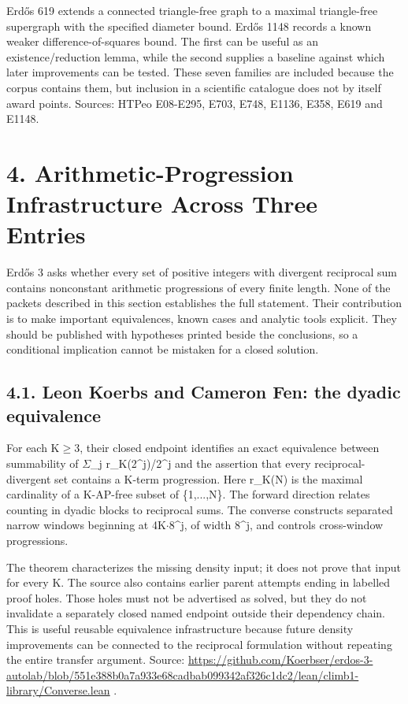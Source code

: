 \documentclass[11pt,a4paper]{article}
\begin{document}
Erdős 619 extends a connected triangle-free graph to a maximal triangle-free supergraph with the specified diameter bound. Erdős 1148 records a known weaker difference-of-squares bound. The first can be useful as an existence/reduction lemma, while the second supplies a baseline against which later improvements can be tested. These seven families are included because the corpus contains them, but inclusion in a scientific catalogue does not by itself award points. Sources: HTPeo E08-E295, E703, E748, E1136, E358, E619 and E1148.

\section{4. Arithmetic-Progression Infrastructure Across Three Entries}
Erdős 3 asks whether every set of positive integers with divergent reciprocal sum contains nonconstant arithmetic progressions of every finite length. None of the packets described in this section establishes the full statement. Their contribution is to make important equivalences, known cases and analytic tools explicit. They should be published with hypotheses printed beside the conclusions, so a conditional implication cannot be mistaken for a closed solution.

\subsection{4.1. Leon Koerbs and Cameron Fen: the dyadic equivalence}
For each K\ensuremath{\geq}3, their closed endpoint identifies an exact equivalence between summability of \ensuremath{\Sigma}\_j r\_K(2\textasciicircum{}j)/2\textasciicircum{}j and the assertion that every reciprocal-divergent set contains a K-term progression. Here r\_K(N) is the maximal cardinality of a K-AP-free subset of \{1,...,N\}. The forward direction relates counting in dyadic blocks to reciprocal sums. The converse constructs separated narrow windows beginning at 4K\ensuremath{\cdot}8\textasciicircum{}j, of width 8\textasciicircum{}j, and controls cross-window progressions.

The theorem characterizes the missing density input; it does not prove that input for every K. The source also contains earlier parent attempts ending in labelled proof holes. Those holes must not be advertised as solved, but they do not invalidate a separately closed named endpoint outside their dependency chain. This is useful reusable equivalence infrastructure because future density improvements can be connected to the reciprocal formulation without repeating the entire transfer argument. Source: \url{https://github.com/Koerbser/erdos-3-autolab/blob/551e388b0a7a933e68cadbab099342af326c1dc2/lean/climb1-library/Converse.lean} .
\end{document}
